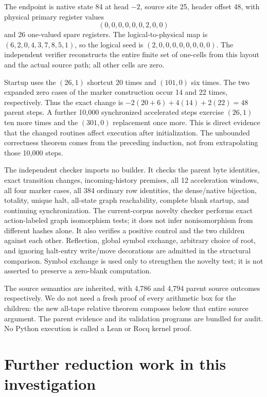 \documentclass[11pt,letterpaper]{article}
\begin{document}
The endpoint is native state 84 at head $-2$, source site 25, header offset
48, with physical primary register values
\[
 (0,0,0,0,0,0,2,0,0)
\]
and 26 one-valued spare registers. The logical-to-physical map is
$(6,2,0,4,3,7,8,5,1)$, so the logical seed is
$(2,0,0,0,0,0,0,0,0)$. The independent verifier reconstructs the entire
finite set of one-cells from this layout and the actual source path; all
other cells are zero.

Startup uses the $(26,1)$ shortcut 20 times and $(101,0)$ six times.
The two expanded zero cases of the marker construction occur 14 and 22
times, respectively. Thus the exact change is
$-2(20+6)+4(14)+2(22)=48$ parent steps.
A further 10,000 synchronized accelerated steps exercise $(26,1)$ ten
more times and the $(301,0)$ replacement once more. This is direct evidence
that the changed routines affect execution after initialization. The
unbounded correctness theorem comes from the preceding induction, not
from extrapolating those 10,000 steps.

The independent checker imports no builder. It checks the parent byte
identities, exact transition changes, incoming-history premises, all 12
acceleration windows, all four marker cases, all 384 ordinary row
identities, the dense/native bijection, totality, unique halt, all-state
graph reachability, complete blank startup, and continuing synchronization.
The current-corpus novelty checker performs exact action-labeled graph
isomorphism tests; it does not infer nonisomorphism from different hashes
alone. It also verifies a positive control and the two children against
each other. Reflection, global symbol exchange, arbitrary choice of root,
and ignoring halt-entry write/move decorations are admitted in the
structural comparison. Symbol exchange is used only to strengthen the
novelty test; it is not asserted to preserve a zero-blank computation.

The source semantics are inherited, with 4,786 and 4,794 parent source
outcomes respectively. We do not need a fresh proof of every arithmetic
box for the children: the new all-tape relative theorem composes below
that entire source argument. The parent evidence and its validation
programs are bundled for audit. No Python execution is called a Lean or
Rocq kernel proof.

\section{Further reduction work in this investigation}
\label{sec:search}

\end{document}
